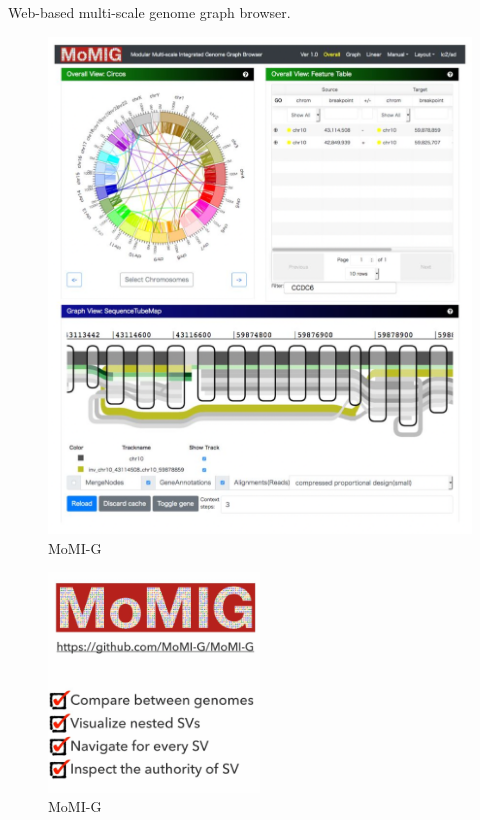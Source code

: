 \documentclass[
]{book}
\begin{document}
Web-based multi-scale genome graph browser.

\begin{figure}
\centering
\includegraphics[width=1\textwidth,height=\textheight]{./Figures/momig1.png}
\caption{MoMI-G}
\end{figure}

\begin{figure}
\centering
\includegraphics[width=0.5\textwidth,height=\textheight]{./Figures/momig2.png}
\caption{MoMI-G}
\end{figure}
\end{document}
